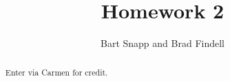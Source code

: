 \documentclass[handout]{xourse}
\title{Homework 2}
\author{Bart Snapp and Brad Findell}
\begin{document}
\begin{abstract}
Enter via Carmen for credit. 
\end{abstract}
\maketitle

\worksheetstyle
\end{document}
